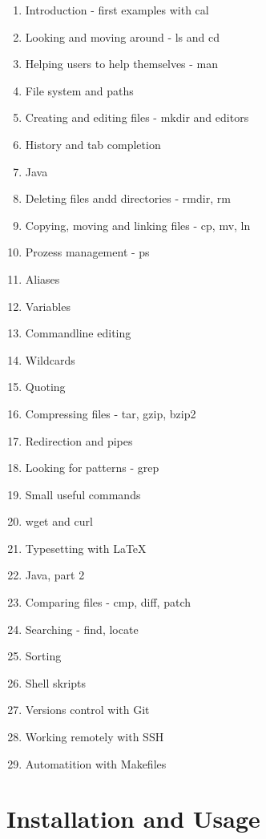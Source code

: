 \documentclass[paper=a4,twoside,abstract=on,cleardoublepage=empty,numbers=noenddot,toc=bib,12pt,appendixprefix=true]{scrreprt}
\begin{document}
\begin{multicols}{2}
    \footnotesize
    \begin{enumerate}
        \item Introduction - first examples with cal
        \item Looking and moving around - ls and cd
        \item Helping users to help themselves - man
        \item File system and paths
        \item Creating and editing files - mkdir and editors
        \item History and tab completion
        \item Java
        \item Deleting files andd directories - rmdir, rm
        \item Copying, moving and linking files - cp, mv, ln
        \item Prozess management - ps
        \item Aliases
        \item Variables
        \item Commandline editing
        \item Wildcards
        \item Quoting
        \item Compressing files - tar, gzip, bzip2
        \item Redirection and pipes
        \item Looking for patterns - grep
        \item Small useful commands
        \item wget and curl
        \item Typesetting with LaTeX
        \item Java, part 2
        \item Comparing files - cmp, diff, patch
        \item Searching - find, locate
        \item Sorting
        \item Shell skripts
        \item Versions control with Git
        \item Working remotely with SSH
        \item Automatition with Makefiles
    \end{enumerate}
\end{multicols}

\chapter{Installation and Usage}
\label{sec:usage}
\end{document}
